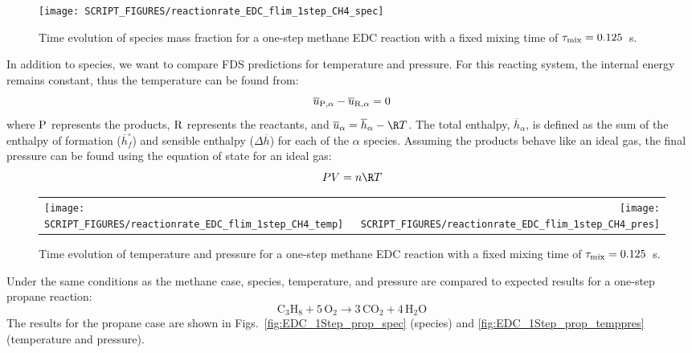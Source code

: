 \documentclass[11pt]{book}
\begin{document}
\begin{figure}[!ht]
\centering
\texttt{[image: SCRIPT\_FIGURES/reactionrate\_EDC\_flim\_1step\_CH4\_spec]}
\caption[Species evolution in a 1-step methane EDC reaction]{Time evolution of species mass fraction for a one-step methane EDC reaction with a fixed mixing time of $\tau_{\rm mix}=0.125$~s.}
\label{fig:EDC_1Step_meth_spec}
\end{figure}

In addition to species, we want to compare FDS predictions for temperature and pressure. For this reacting system, the internal energy remains constant, thus the temperature can be found from:
\begin{equation}\label{eq:del_u}
\overline{u}_{{\rm P},\alpha} - \overline{u}_{{\rm R},\alpha} = 0
\end{equation}
where ${\rm P}$ represents the products, ${\rm R}$ represents the reactants, and $\overline{u}_{\alpha}=\overline{h}_{\alpha}-\R T$. The total enthalpy, $\overline{h}_{\alpha}$, is defined as the sum of the enthalpy of formation ($\overline{h}_{f}^{\circ}$) and sensible enthalpy ($\Delta \overline{h}$) for each of the $\alpha$ species. Assuming the products behave like an ideal gas, the final pressure can be found using the equation of state for an ideal gas:
\begin{equation}\label{eq:ideal_gas}
PV = n \R T
\end{equation}
\begin{figure}[!ht]
\begin{tabular*}{\textwidth}{lr}
\texttt{[image: SCRIPT\_FIGURES/reactionrate\_EDC\_flim\_1step\_CH4\_temp]} &
\texttt{[image: SCRIPT\_FIGURES/reactionrate\_EDC\_flim\_1step\_CH4\_pres]}
\end{tabular*}
\caption[Temperature and pressure evolution in a 1-step methane EDC reaction]{Time evolution of temperature and pressure for a one-step methane EDC reaction with a fixed mixing time of $\tau_{\rm mix}=0.125$~s.}
\label{fig:EDC_1Step_meth_temppres}
\end{figure}

Under the same conditions as the methane case, species, temperature, and pressure are compared to expected results for a one-step propane reaction:
\begin{equation}\label{eq:1step_propane}
\mathrm{C_3H_8 + 5\, O_2 \rightarrow  3\, CO_2 + 4\, H_2O}
\end{equation}
The results for the propane case are shown in Figs.~\ref{fig:EDC_1Step_prop_spec} (species) and \ref{fig:EDC_1Step_prop_temppres} (temperature and pressure).
\end{document}
